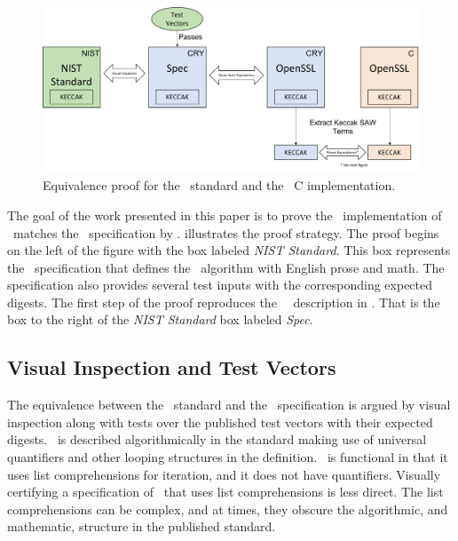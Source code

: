 \begin{figure}[t]
  \centering
  \includegraphics[width=\linewidth]{figs/proof.png}
  
  \caption{Equivalence proof for the \shaThree\ standard and the \openssl\ C implementation.}
  \label{fig:proofStructure}
  
\end{figure}

The goal of the work presented in this paper is to prove the \openssl\ implementation of \shaThree\ matches the \fips\ specification by \nist.
 illustrates the proof strategy.
The proof begins on the left of the figure with the box labeled \emph{NIST Standard}. 
This box represents the \fips\ specification that defines the \shaThree\ algorithm with English prose and math.
The specification also provides several test inputs with the corresponding expected digests.
The first step of the proof reproduces the \fips\ \shaThree\ description in \cryptol.
That is the box to the right of the \emph{NIST Standard} box labeled \emph{Spec}.

\subsection{Visual Inspection and Test Vectors}

The equivalence between the \fips\ standard and the \cryptol\ specification is argued by visual inspection along with tests over the published test vectors with their expected digests.
\shaThree\ is described algorithmically in the standard making use of universal quantifiers and other looping structures in the definition.
\cryptol\ is functional in that it uses list comprehensions for iteration, and it does not have quantifiers.
Visually certifying a specification of \shaThree\ that uses list comprehensions is less direct.
The list comprehensions can be complex, and at times, they obscure the algorithmic, and mathematic, structure in the published standard.


